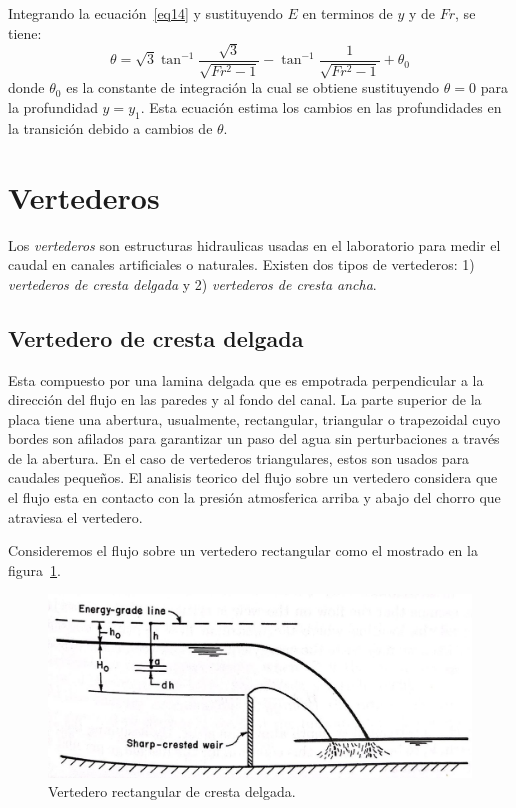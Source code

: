 \documentclass[11pt, oneside]{article}
\begin{document}
Integrando la ecuaci\'on~\ref{eq14} y sustituyendo $E$ en terminos de $y$ y de $Fr$, se tiene:
\begin{equation}
   \theta = \sqrt{3}\tan^{-1} \frac{\sqrt{3}}{\sqrt{Fr^2 - 1}} - \tan^{-1} \frac{1}{\sqrt{Fr^2 -1}} + \theta_0
    \label{eq15}
\end{equation}
donde $\theta_0$ es la constante de integraci\'on la cual se obtiene sustituyendo $\theta = 0$ para la profundidad $y = y_1$. Esta ecuaci\'on estima los cambios en las profundidades en la transici\'on debido a cambios de $\theta$. 

\section{Vertederos}
Los \emph{vertederos} son estructuras hidraulicas usadas en el laboratorio para medir el caudal en canales artificiales o naturales. Existen dos tipos de vertederos: 1) \emph{vertederos de cresta delgada} y 2) \emph{vertederos de cresta ancha}. 

\subsection{Vertedero de cresta delgada}
Esta compuesto por una lamina delgada que es empotrada perpendicular a la direcci\'on del flujo en las paredes y al fondo del canal. La parte superior de la placa tiene una abertura, usualmente, rectangular, triangular o trapezoidal cuyo bordes son afilados para garantizar un paso del agua sin perturbaciones a trav\'es de la abertura. En el caso de vertederos triangulares, estos son usados para caudales pequeños. El analisis teorico del flujo sobre un vertedero considera que el flujo esta en contacto con la presi\'on atmosferica arriba y abajo del chorro que atraviesa el vertedero.  

Consideremos el flujo sobre un vertedero rectangular como el mostrado en la figura~\ref{fig77}. 
\begin{figure}[h]
    \centering
    \includegraphics[width=0.8\linewidth]{fig77.jpeg}
    \caption{Vertedero rectangular de cresta delgada.}
    \label{fig77}
\end{figure}
\end{document}
